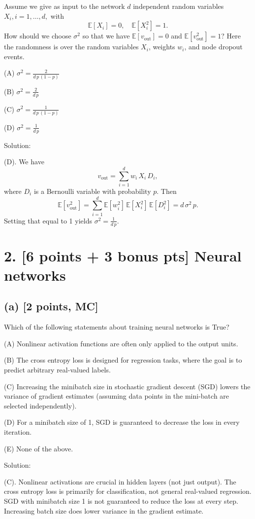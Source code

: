 \documentclass[twocolumn]{article}
\begin{document}
\begin{spacing}{1}
Assume we give as input to the network \(d\) independent random variables \(X_i, i=1,\ldots,d,\) with
\[
\mathbb{E}[X_i] = 0, \quad \mathbb{E}[X_i^2] = 1.
\]
How should we choose \(\sigma^2\) so that we have \(\mathbb{E}[v_{\text{out}}] = 0\) and \(\mathbb{E}[v_{\text{out}}^2] = 1\)? Here the randomness is over the random variables \(X_i\), weights \(w_i\), and node dropout events.

(A) \(\sigma^2 = \frac{2}{d\,p\,(1-p)}\)

(B) \(\sigma^2 = \frac{2}{d\,p}\)

(C) \(\sigma^2 = \frac{1}{d\,p\,(1-p)}\)

(D) \(\sigma^2 = \frac{1}{d\,p}\)

Solution:

(D). We have
\[
v_{\text{out}} = \sum_{i=1}^d w_i\,X_i\,D_i,
\]
where \(D_i\) is a Bernoulli variable with probability \(p\). Then
\[
\mathbb{E}[v_{\text{out}}^2] 
= \sum_{i=1}^d \mathbb{E}[w_i^2]\,\mathbb{E}[X_i^2]\,\mathbb{E}[D_i^2] 
= d\,\sigma^2 \,p.
\]
Setting that equal to 1 yields \(\sigma^2 = \frac{1}{d\,p}\).

\bigskip

\section{2. [6 points + 3 bonus pts] Neural networks}

\subsection*{(a) [2 points, MC]}
Which of the following statements about training neural networks is True?

(A) Nonlinear activation functions are often only applied to the output units.

(B) The cross entropy loss is designed for regression tasks, where the goal is to predict arbitrary real-valued labels.

(C) Increasing the minibatch size in stochastic gradient descent (SGD) lowers the variance of gradient estimates (assuming data points in the mini-batch are selected independently).

(D) For a minibatch size of 1, SGD is guaranteed to decrease the loss in every iteration.

(E) None of the above.

Solution:

(C). Nonlinear activations are crucial in hidden layers (not just output). The cross entropy loss is primarily for classification, not general real-valued regression. SGD with minibatch size 1 is not guaranteed to reduce the loss at every step. Increasing batch size does lower variance in the gradient estimate.


\end{spacing}
\end{document}
